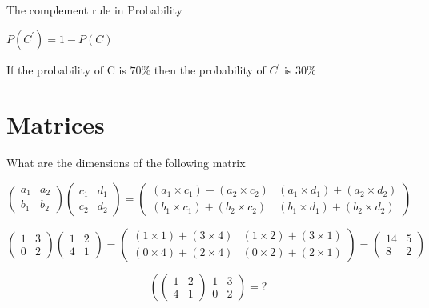 


The complement rule in Probability

$P(C^{\prime}) = 1- P(C)$

 

If the probability of C is $70 \%$ then the probability of $C^{\prime}$ is $30\%$
\section{Matrices}

What are the dimensions of the following matrix


\[ \left(
\begin{array}{cc}
a_1 & a_2 \\ 
b_1 & b_2
\end{array} \right)\left(
\begin{array}{cc}
c_1 & d_1 \\ 
c_2 & d_2
\end{array} \right) = \left(
\begin{array}{cc}
(a_1 \times c_1) + (a_2 \times c_2) & (a_1 \times d_1) + (a_2 \times d_2) \\ 
(b_1 \times c_1) + (b_2 \times c_2) & (b_1 \times d_1) + (b_2 \times d_2)
\end{array} \right) \]

\bigskip
\large{
\[ \left(
\begin{array}{cc}
1 & 3 \\ 
0 & 2
\end{array} \right)\left(
\begin{array}{cc}
1 & 2 \\ 
4 & 1
\end{array} \right) = \left(
\begin{array}{cc}
(1 \times 1) + (3 \times 4) & (1 \times 2) + (3 \times 1) \\ 
(0 \times 4) + (2 \times 4) & (0 \times 2) + (2 \times 1)
\end{array} \right) = \left(
\begin{array}{cc}
14 & 5 \\ 
8 & 2
\end{array} \right) \]
}

\[ \left(
\left(
\begin{array}{cc}
1 & 2 \\ 
4 & 1
\end{array} \right)
\begin{array}{cc}
1 & 3 \\ 
0 & 2
\end{array} \right) = ? \]





